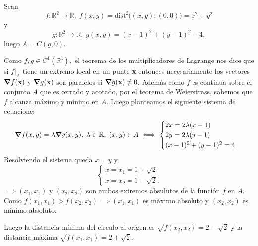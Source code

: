 \begin{solution}
    Sean
    \[
        f: \mathbb{R}^2 \rightarrow \mathbb{R}, \; f(x,y) = \text{dist}^2\Big((x,y);(0,0)\Big)  = x^2 + y^2
    \]
    y
    \[
        g: \mathbb{R}^2 \rightarrow \mathbb{R}, \; g(x,y) = (x-1)^2 + (y-1)^2 - 4,
    \]
    luego $A=C(g,0) $.

    Como $f,g \in C^1( \mathbb{R}^1),$  el teorema de los multiplicadores de Lagrange nos dice que si $f \big\rvert _A$ tiene un extremo local en un punto \textbf{x} entonces necesariamente los vectores $\grad f(\textbf{x})$ y $\grad g(\textbf{x})$ son paralelos si $\grad g(\textbf{x}) \neq 0$.   Además como $f$ es continua sobre el conjunto $A$ que es cerrado y acotado, por el teorema de Weierstrass, sabemos que $f$ alcanza m\'aximo y m\'inimo en $A$. Luego planteamos el siguiente sistema de ecuaciones
    \[
        \grad f(x,y) = \lambda \grad g(x,y), \; \lambda \in \mathbb{R}, \; (x,y) \in A \\
        \iff \begin{cases}
            2x = 2\lambda(x-1) \\
            2y = 2\lambda(y-1) \\
            (x-1)^2 + (y-1)^2 = 4
        \end{cases}
    \]
    Resolviendo el sistema queda $x=y$  \;  y \[ \begin{cases}
            x=   x_1=1+\sqrt{2} \\
            x=  x_2=1-\sqrt{2}.
        \end{cases}\]
    $\implies (x_1,x_1)$  y $(x_2,x_2)$  son ambos extremos absulutos de la función $f$  en $A$. Como $f(x_1,x_1) > f(x_2,x_2) \implies (x_1,x_1)$ es máximo absoluto y $(x_2,x_2)$ es mínimo absoluto.

    Luego  la distancia mínima del circulo al origen es $\sqrt{f(x_2,x_2)} = 2-\sqrt{2} $ y la distancia máxima $\sqrt{f(x_1,x_1)} = 2+\sqrt{2}$.
\end{solution}


